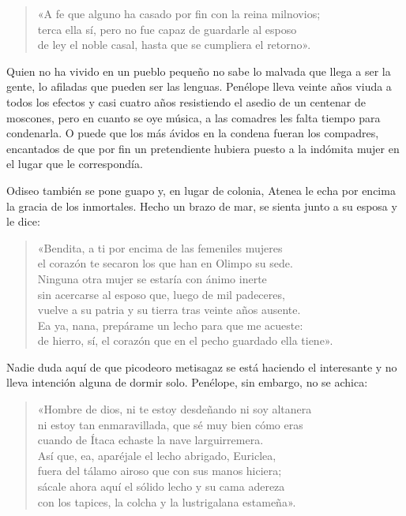 \begin{verse}
«A fe que alguno ha casado por fin con la reina milnovios;\\
terca ella sí, pero no fue capaz de guardarle al esposo\\
de ley el noble casal, hasta que se cumpliera el retorno».
\end{verse}

Quien no ha vivido en un pueblo pequeño no sabe lo malvada que llega a ser la gente, lo afiladas que pueden ser las lenguas. Penélope lleva veinte años viuda a todos los efectos y casi cuatro años resistiendo el asedio de un centenar de moscones, pero en cuanto se oye música, a las comadres les falta tiempo para condenarla. O puede que los más ávidos en la condena fueran los compadres, encantados de que por fin un pretendiente hubiera puesto a la indómita mujer en el lugar que le correspondía.

Odiseo también se pone guapo y, en lugar de colonia, Atenea le echa por encima la gracia de los inmortales. Hecho un brazo de mar, se sienta junto a su esposa y le dice:

\begin{verse}
«Bendita, a ti por encima de las femeniles mujeres\\
el corazón te secaron los que han en Olimpo su sede.\\
Ninguna otra mujer se estaría con ánimo inerte\\
sin acercarse al esposo que, luego de mil padeceres,\\
vuelve a su patria y su tierra tras veinte años ausente.\\
Ea ya, nana, prepárame un lecho para que me acueste:\\
de hierro, sí, el corazón que en el pecho guardado ella tiene».
\end{verse}

Nadie duda aquí de que picodeoro metisagaz se está haciendo el interesante y no lleva intención alguna de dormir solo. Penélope, sin embargo, no se achica:

\begin{verse}
«Hombre de dios, ni te estoy desdeñando ni soy altanera\\
ni estoy tan enmaravillada, que sé muy bien cómo eras\\
cuando de Ítaca echaste la nave larguirremera.\\
Así que, ea, aparéjale el lecho abrigado, Euriclea,\\
fuera del tálamo airoso que con sus manos hiciera;\\
sácale ahora aquí el sólido lecho y su cama adereza\\
con los tapices, la colcha y la lustrigalana estameña».
\end{verse}

